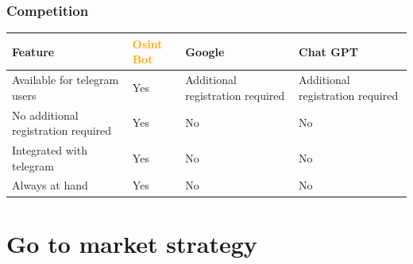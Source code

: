 \documentclass{beamer}
\begin{document}
\begin{frame}
    \frametitle{Competition}
    
    \begin{table}[ht]
        \centering
        \begin{tabular}{|>{\raggedright\arraybackslash}m{2cm}|>{\centering\arraybackslash}m{2.5cm}|>{\centering\arraybackslash}m{2.5cm}|>{\centering\arraybackslash}m{2.5cm}|}
        \hline
        \rowcolor{white} \textbf{Feature} & \textbf{\textcolor{orange}{Osint Bot}} & \textbf{Google} & \textbf{Chat GPT} \\
        \hline
        Available for telegram users & \cellcolor{green!10} Yes & \cellcolor{red!10} Additional registration required & \cellcolor{red!10} Additional registration required \\
        \hline
        No additional registration required & \cellcolor{green!10} Yes & \cellcolor{red!10} No & \cellcolor{red!10} No \\
        \hline
        Integrated with telegram & \cellcolor{green!10} Yes & \cellcolor{red!10} No & \cellcolor{red!10} No \\
        \hline
        Always at hand & \cellcolor{green!10} Yes & \cellcolor{red!10} No & \cellcolor{red!10} No \\
        \hline
        \end{tabular}
    \end{table}
    
\end{frame}

\section{Go to market strategy}
\end{document}
